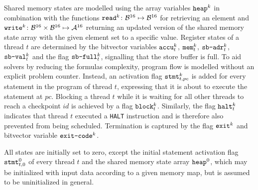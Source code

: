 Shared memory states are modelled using the array variables $\texttt{heap}^k$ in combination with the functions $\texttt{read}^k \colon \mathcal{B}^{16} \mapsto \mathcal{B}^{16}$ for retrieving an element and $\texttt{write}^k \colon \mathcal{B}^{16} \times \mathcal{B}^{16} \mapsto \mathcal{A}^{16}$ returning an updated version of the shared memory state array with the given element set to a specific value.
Register states of a thread $t$ are determined by the bitvector variables $\texttt{accu}^k_t$, $\texttt{mem}^k_t$, $\texttt{sb-adr}^k_t$, $\texttt{sb-val}^k_t$ and the flag $\texttt{sb-full}^k_t$, signalling that the store buffer is full.
To aid solvers by reducing the formulas complexity, program flow is modelled without an explicit problem counter.
Instead, an activation flag $\texttt{stmt}^k_{t, pc}$ is added for every statement in the program of thread $t$, expressing that it is about to execute the statement at $pc$.
Blocking a thread $t$ while it is waiting for all other threads to reach a checkpoint $id$ is achieved by a flag $\texttt{block}^k_t$.
Similarly, the flag $\texttt{halt}^k_t$ indicates that thread $t$ executed a \texttt{HALT} instruction and is therefore also prevented from being scheduled.
Termination is captured by the flag $\texttt{exit}^k$ and bitvector variable $\texttt{exit-code}^k$.

All states are initially set to zero, except the initial statement activation flag $\texttt{stmt}^0_{t, 0}$ of every thread $t$ and the shared memory state array $\texttt{heap}^0$, which may be initialized with input data according to a given memory map, but is assumed to be uninitialized in general.

